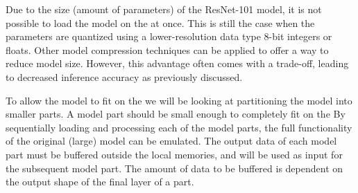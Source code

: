 Due to the size (amount of parameters) of the ResNet-101 model, it is not possible to load the model on the \graicore{} at once.
This is still the case when the parameters are quantized using a lower-resolution data type 8-bit integers or floats.
Other model compression techniques can be applied to offer a way to reduce model size.
However, this advantage often comes with a trade-off, leading to decreased inference accuracy as previously discussed.


To allow the model to fit on the \graicore{} we will be looking at partitioning the model into smaller parts.
A model part should be small enough to completely fit on the \graicore{}
By sequentially loading and processing each of the model parts, the full functionality of the original (large) model can be emulated.
The output data of each model part must be buffered outside the local memories, and will be used as input for the subsequent model part.
The amount of data to be buffered is dependent on the output shape of the final layer of a part.

